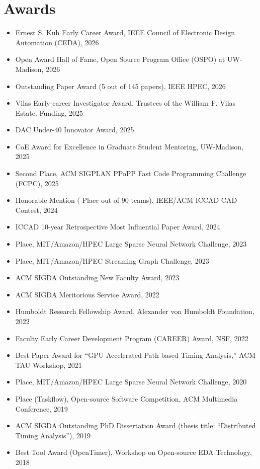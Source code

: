 \documentclass[A4,11pt]{article}
\begin{document}
\section{Awards}
 \begin{itemize}
 \itemsep-3pt
    \item Ernest S. Kuh Early Career Award, IEEE Council of Electronic Design Automation (CEDA), 2026
    \item Open Award Hall of Fame, Open Source Program Office (OSPO) at UW-Madison, 2026
    \item Outstanding Paper Award (5 out of 145 papers), IEEE HPEC, 2026
    \item Vilas Early-career Investigator Award, Trustees of the William F. Vilas Estate. Funding, 2025
    \item DAC Under-40 Innovator Award, 2025
    \item CoE Award for Excellence in Graduate Student Mentoring, UW-Madison, 2025
    \item Second Place, ACM SIGPLAN PPoPP Fast Code Programming Challenge (FCPC), 2025
    \item Honorable Mention ( Place out of 90 teams), IEEE/ACM ICCAD CAD Contest, 2024
    \item ICCAD 10-year Retrospective Most Influential Paper Award, 2024
    \item {} Place, MIT/Amazon/HPEC Large Sparse Neural Network Challenge, 2023
    \item {} Place, MIT/Amazon/HPEC Streaming Graph Challenge, 2023
    \item ACM SIGDA Outstanding New Faculty Award, 2023
    \item ACM SIGDA Meritorious Service Award, 2022
    \item Humboldt Research Fellowship Award, Alexander von Humboldt Foundation, 2022
    \item Faculty Early Career Development Program (CAREER) Award, NSF, 2022
    \item Best Paper Award for ``GPU-Accelerated Path-based Timing Analysis,'' ACM TAU Workshop, 2021
    \item {} Place, MIT/Amazon/HPEC Large Sparse Neural Network Challenge, 2020
    \item {} Place (Taskflow), Open-source Software Competition, ACM Multimedia Conference, 2019
    \item ACM SIGDA Outstanding PhD Dissertation Award (thesis title: ``Distributed Timing Analysis''), 2019
    \item Best Tool Award (OpenTimer), Workshop on Open-source EDA Technology, 2018

\end{itemize}
\end{document}
